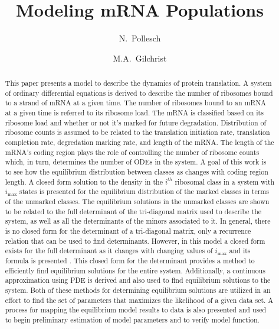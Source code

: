\documentclass[review]{elsarticle}
\newcommand{\imax}{\ensuremath{i_{\max}}\xspace}
\begin{document}
\title{Modeling mRNA Populations}
\author[utkm,curradd]{N.~Pollesch}
\author[utkeeb,nimbios]{M.A.~Gilchrist}
\address[utkm]{Department of Mathematics, University of Tennessee,  Knoxville, TN 37996-1320}
\address[curradd]{Department of ??, Environmental Protection Agency, Duluth MN XXXXX}
\address[utkeeb]{Department of Ecology and Evolutionary Biology, University of Tennessee, Knoxville, TN 37996-1610}
\address[nimbios]{National Institute for Mathematical and Biological Synthesis, University of Tennessee, Knoxville, TN 37996-3410}

\begin{abstract}
This paper presents a model to describe the dynamics of protein translation.  
A system of ordinary differential equations is derived to describe the number of ribosomes bound to a strand of mRNA at a given time.
The number of ribosomes bound to an mRNA at a given time is referred to its ribosome load.
The mRNA is classified based on its ribosome load and whether or not it's marked for future degradation.  
Distribution of ribosome counts is assumed to be related to the translation initiation rate, translation completion rate, degredation marking rate, and length of the mRNA.
The length of the mRNA's coding region plays the role of controlling the number of ribosome counts which, in turn, determines the number of ODEs in the system.  
A goal of this work is to see how the equilibrium distribution between classes as changes with coding region length.
A closed form solution to the density in the $i^{th}$ ribosomal class in a system with \imax states is presented for the equilibrium distribution of the marked classes in terms of the unmarked classes.
The equilibrium solutions in the unmarked classes are shown to be related to the full determinant of the tri-diagonal matrix used to describe the system, as well as all the determinants of the minors associated to it.
In general, there is no closed form for the determinant of a tri-diagonal matrix, only a recurrence relation that can be used to find determinants.
However, in this model a closed form exists for the full determinant as it changes with changing values of \imax and its formula is presented .
This closed form for the determinant provides a method to efficiently find equilibrium solutions for the entire system.
Additionally, a continuous approximation using PDE is derived and also used to find equilibrium solutions to the system.
Both of these methods for determining equilibrium solutions are utilized in an effort to find the set of parameters that maximizes the likelihood of a given data set.
A process for mapping the equilibrium model results to data is also presented and used to begin preliminary estimation of model parameters and to verify model function.
 

\end{abstract}
\end{document}
